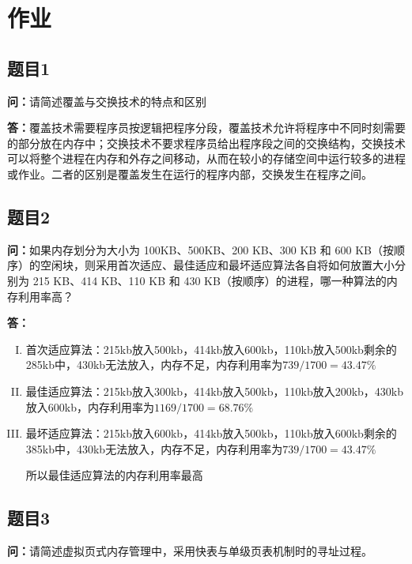 \documentclass[12pt,hyperref,a4paper,UTF8]{ctexart}
\begin{document}
\cover
\thispagestyle{empty}%
\newpage


\newpage
\tableofcontents

\newpage

\section{作业}
\subsection{题目1}
\textbf{问：}请简述覆盖与交换技术的特点和区别

\textbf{答：}覆盖技术需要程序员按逻辑把程序分段，覆盖技术允许将程序中不同时刻需要的部分放在内存中；交换技术不要求程序员给出程序段之间的交换结构，交换技术可以将整个进程在内存和外存之间移动，从而在较小的存储空间中运行较多的进程或作业。二者的区别是覆盖发生在运行的程序内部，交换发生在程序之间。

\subsection{题目2}
\textbf{问：}如果内存划分为大小为 100KB、500KB、200 KB、300 KB 和 600 KB（按顺序）的空闲块，则采用首次适应、最佳适应和最坏适应算法各自将如何放置大小分别为 215 KB、414 KB、110 KB 和 430 KB（按顺序）的进程，哪一种算法的内存利用率高？

\textbf{答：}
\begin{enumerate}[I.]
    \item 首次适应算法：215kb放入500kb，414kb放入600kb，110kb放入500kb剩余的285kb中，430kb无法放入，内存不足，内存利用率为$739/1700=43.47\%$
    \item 最佳适应算法：215kb放入300kb，414kb放入500kb，110kb放入200kb，430kb放入600kb，内存利用率为$1169/1700=68.76\%$
    \item 最坏适应算法：215kb放入600kb，414kb放入500kb，110kb放入600kb剩余的385kb中，430kb无法放入，内存不足，内存利用率为$739/1700=43.47\%$
    
    所以最佳适应算法的内存利用率最高

\end{enumerate}

\subsection{题目3}
\textbf{问：}请简述虚拟页式内存管理中，采用快表与单级页表机制时的寻址过程。
\end{document}
